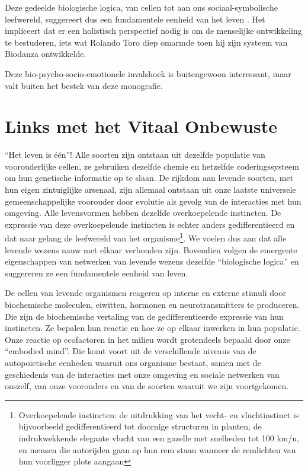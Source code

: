 \documentclass[
  11pt,
]{book}
\begin{document}
Deze gedeelde biologische logica, van cellen tot aan ons sociaal-symbolische leefwereld, suggereert dus een fundamentele eenheid van het leven \citep{capraLuisi2014}. Het impliceert dat er een holistisch perspectief nodig is om de menselijke ontwikkeling te bestuderen, iets wat Rolando Toro diep omarmde toen hij zijn systeem van Biodanza ontwikkelde.

Deze bio-psycho-socio-emotionele invalshoek is buitengewoon interessant, maar valt buiten het bestek van deze monografie.

\hypertarget{links-met-het-vitaal-onbewuste}{%
\section{Links met het Vitaal Onbewuste}\label{links-met-het-vitaal-onbewuste}}

``Het leven is één''! Alle soorten zijn ontstaan uit dezelfde populatie van voorouderlijke cellen, ze gebruiken dezelfde chemie en hetzelfde coderingssysteem om hun genetische informatie op te slaan. De rijkdom aan levende soorten, met hun eigen zintuiglijke arsenaal, zijn allemaal ontstaan uit onze laatste universele gemeenschappelijke voorouder door evolutie als gevolg van de interacties met hun omgeving. Alle levensvormen hebben dezelfde overkoepelende instincten. De expressie van deze overkoepelende instincten is echter anders gedifferentieerd en dat naar gelang de leefwereld van het organisme\footnote{Overkoepelende instincten: de uitdrukking van het vecht- en vluchtinstinct is bijvoorbeeld gedifferentieerd tot doornige structuren in planten, de indrukwekkende elegante vlucht van een gazelle met snelheden tot 100 km/u, en mensen die autorijden gaan op hun rem staan wanneer de remlichten van hun voorligger plots aangaan}. We voelen dus aan dat alle levende wezens nauw met elkaar verbonden zijn. Bovendien volgen de emergente eigenschappen van netwerken van levende wezens dezelfde ``biologische logica'' en suggereren ze een fundamentele eenheid van leven.

De cellen van levende organismen reageren op interne en externe stimuli door biochemische moleculen, eiwitten, hormonen en neurotransmitters te produceren. Die zijn de biochemische vertaling van de gedifferentieerde expressie van hun instincten. Ze bepalen hun reactie en hoe ze op elkaar inwerken in hun populatie. Onze reactie op ecofactoren in het milieu wordt grotendeels bepaald door onze ``embodied mind''. Die komt voort uit de verschillende niveaus van de autopoietische eenheden waaruit ons organisme bestaat, samen met de geschiedenis van de interacties met onze omgeving en sociale netwerken van onszelf, van onze voorouders en van de soorten waaruit we zijn voortgekomen.
\end{document}
